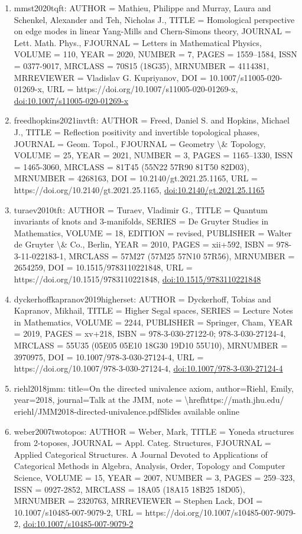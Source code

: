 \documentclass[11pt]{article}
\begin{document}
\begin{enumerate}[leftmargin=*]
  \item mmst2020tqft: AUTHOR = Mathieu, Philippe and Murray, Laura and Schenkel, Alexander and Teh, Nicholas J., TITLE = Homological perspective on edge modes in linear Yang-Mills and Chern-Simons theory, JOURNAL = Lett. Math. Phys., FJOURNAL = Letters in Mathematical Physics, VOLUME = 110, YEAR = 2020, NUMBER = 7, PAGES = 1559--1584, ISSN = 0377-9017, MRCLASS = 70S15 (18G35), MRNUMBER = 4114381, MRREVIEWER = Vladislav G. Kupriyanov, DOI = 10.1007/s11005-020-01269-x, URL = https://doi.org/10.1007/s11005-020-01269-x, \href{https://doi.org/10.1007/s11005-020-01269-x}{doi:10.1007/s11005-020-01269-x}
  \item freedhopkins2021invtft: AUTHOR = Freed, Daniel S. and Hopkins, Michael J., TITLE = Reflection positivity and invertible topological phases, JOURNAL = Geom. Topol., FJOURNAL = Geometry \textbackslash{}\& Topology, VOLUME = 25, YEAR = 2021, NUMBER = 3, PAGES = 1165--1330, ISSN = 1465-3060, MRCLASS = 81T45 (55N22 57R90 81T50 82D03), MRNUMBER = 4268163, DOI = 10.2140/gt.2021.25.1165, URL = https://doi.org/10.2140/gt.2021.25.1165, \href{https://doi.org/10.2140/gt.2021.25.1165}{doi:10.2140/gt.2021.25.1165}
  \item turaev2010tft: AUTHOR = Turaev, Vladimir G., TITLE = Quantum invariants of knots and 3-manifolds, SERIES = De Gruyter Studies in Mathematics, VOLUME = 18, EDITION = revised, PUBLISHER = Walter de Gruyter \textbackslash{}\& Co., Berlin, YEAR = 2010, PAGES = xii+592, ISBN = 978-3-11-022183-1, MRCLASS = 57M27 (57M25 57N10 57R56), MRNUMBER = 2654259, DOI = 10.1515/9783110221848, URL = https://doi.org/10.1515/9783110221848, \href{https://doi.org/10.1515/9783110221848}{doi:10.1515/9783110221848}
  \item dyckerhoffkapranov2019higherset: AUTHOR = Dyckerhoff, Tobias and Kapranov, Mikhail, TITLE = Higher Segal spaces, SERIES = Lecture Notes in Mathematics, VOLUME = 2244, PUBLISHER = Springer, Cham, YEAR = 2019, PAGES = xv+218, ISBN = 978-3-030-27122-0; 978-3-030-27124-4, MRCLASS = 55U35 (05E05 05E10 18G30 19D10 55U10), MRNUMBER = 3970975, DOI = 10.1007/978-3-030-27124-4, URL = https://doi.org/10.1007/978-3-030-27124-4, \href{https://doi.org/10.1007/978-3-030-27124-4}{doi:10.1007/978-3-030-27124-4}
  \item riehl2018jmm: title=On the directed univalence axiom, author=Riehl, Emily, year=2018, journal=Talk at the JMM, note = \textbackslash{}hrefhttps://math.jhu.edu/ eriehl/JMM2018-directed-univalence.pdfSlides available online
  \item weber2007twotopos: AUTHOR = Weber, Mark, TITLE = Yoneda structures from 2-toposes, JOURNAL = Appl. Categ. Structures, FJOURNAL = Applied Categorical Structures. A Journal Devoted to Applications of Categorical Methods in Algebra, Analysis, Order, Topology and Computer Science, VOLUME = 15, YEAR = 2007, NUMBER = 3, PAGES = 259--323, ISSN = 0927-2852, MRCLASS = 18A05 (18A15 18B25 18D05), MRNUMBER = 2320763, MRREVIEWER = Stephen Lack, DOI = 10.1007/s10485-007-9079-2, URL = https://doi.org/10.1007/s10485-007-9079-2, \href{https://doi.org/10.1007/s10485-007-9079-2}{doi:10.1007/s10485-007-9079-2}

\end{enumerate}
\end{document}
